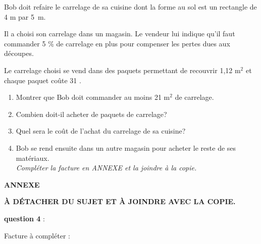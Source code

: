 
\medskip

 Bob doit refaire le carrelage de sa cuisine dont la forme au sol est un rectangle de 4 m par 5~m. 

 Il a choisi son carrelage dans un magasin. Le vendeur lui indique qu'il faut commander 5 \% de carrelage en plus pour compenser les pertes dues aux découpes. 

 Le carrelage choisi se vend dans des paquets permettant de recouvrir 1,12 m$^2$ et chaque paquet coûte 31 \EUR{}. 

\begin{enumerate}
\item Montrer que Bob doit commander au moins 21 m$^2$ de carrelage. 

\item  Combien doit-il acheter de paquets de carrelage? 

\item Quel sera le coût de l'achat du carrelage de sa cuisine? 

\item  Bob se rend ensuite dans un autre magasin pour acheter le reste de ses matériaux.\\
\textit{ Compléter la facture en ANNEXE et la joindre à la copie.}  

\end{enumerate}
\bigskip


\begin{center}
\textbf{ANNEXE }

\textbf{À DÉTACHER DU SUJET ET À JOINDRE AVEC LA COPIE. }
\end{center}


 \textbf{question 4 }: 

 Facture à compléter : \\
\bigskip

